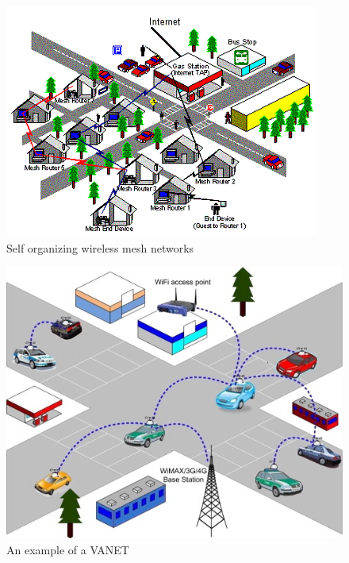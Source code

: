 		\noindent
		\begin{minipage}{0.52\textwidth}
			\begin{figure}[H]
				\centering
				\includegraphics[width=\textwidth]{resources/img/chap4/wms_microsoft}
				\caption[Self organizing wireless mesh networks]{Self organizing wireless mesh networks \cite{bahl2009opportunistic}}
				\label{img:wms_microsoft}
			\end{figure}
		\end{minipage}%
		\hfill%
		\begin{minipage}{0.48\textwidth}\raggedright
			\begin{figure}[H]
				\centering
				\includegraphics[width=\textwidth]{resources/img/chap4/vanet}
				\caption[An example of a VANET]{An example of a VANET \cite{BADIS2015653}}
				\label{img:vanet}
			\end{figure}
		\end{minipage}
		\newline
		
